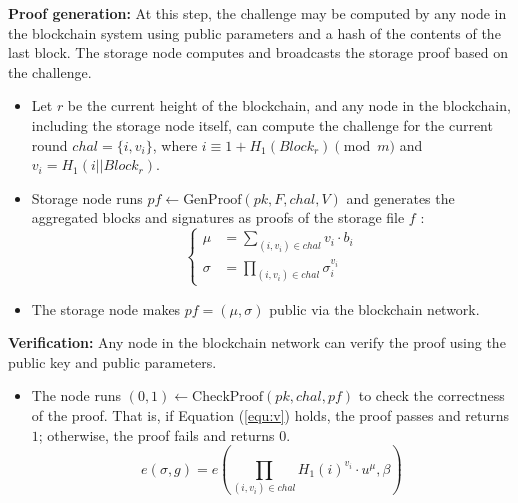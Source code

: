 \documentclass[journal]{IEEEtran}
\begin{document}
\textbf{Proof generation:} 
At this step, the challenge may be computed by any node in the blockchain system using public parameters and a hash of the contents of the last block. The storage node computes and broadcasts the storage proof based on the challenge.
\begin{itemize}
    \item 
    Let $r$ be the current height of the blockchain, and any node in the blockchain, including the storage node itself, can compute the challenge for the current round $chal=\{i,v_{i}\}$, where $i\equiv1+H_{1}(Block_{r}) \pmod{m}$ and $v_{i}=H_{1}(i||Block_{r})$.
    \item 
    Storage node runs $pf \leftarrow \text{GenProof}(pk,F,chal,V)$ and generates the aggregated blocks and signatures as proofs of the storage file $f$ :
    \begin{equation}
    \begin{cases}\mu&=\sum_{(i,v_{i})\in chal}v_{i}\cdot b_{i}\\ \sigma&=\prod_{(i,v_{i})\in chal}\sigma_{i}^{v_{i}}\end{cases}
    \end{equation}
    \item 
    The storage node makes $pf=(\mu,\sigma)$ public via the blockchain network.
\end{itemize}


\textbf{Verification:} 
Any node in the blockchain network can verify the proof using the public key and public parameters.
\begin{itemize}
    \item 
    The node runs $(0,1)\leftarrow \text{CheckProof}(pk,chal,pf)$ to check the correctness of the proof. That is, if Equation (\ref{equ:v}) holds, the proof passes and returns $1$; otherwise, the proof fails and returns $0$.
    \begin{equation}
        \label{equ:v}
    e(\sigma,g)=e(\prod_{(i,v_{i})\in chal}H_{1}(i)^{v_{i}}\cdot u^{\mu},\beta)
    \end{equation}
\end{itemize}
\end{document}
